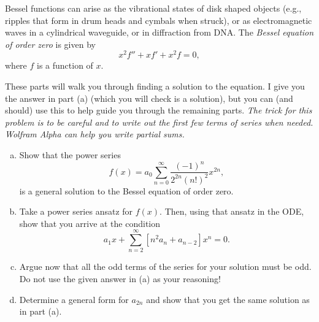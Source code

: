 \documentclass[12pt]{amsbook}
\begin{document}

\newpage
\begin{problem}
Bessel functions can arise as the vibrational states of disk shaped objects (e.g., ripples that form in drum heads and cymbals when struck), or as electromagnetic waves in a cylindrical waveguide, or in diffraction from DNA.  The \emph{Bessel equation of order zero} is given by
\[
x^2 f''+xf'+x^2f =0,
\]
where $f$ is a function of $x$.

These parts will walk you through finding a solution to the equation.  I give you the answer in part (a) (which you will check is a solution), but you can (and should) use this to help guide you through the remaining parts. \emph{The trick for this problem is to be careful and to write out the first few terms of series when needed. Wolfram Alpha can help you write partial sums.}
\begin{enumerate}[(a)]
    \item Show that the power series
    \[
        f(x) = a_0 \sum_{n=0}^\infty \frac{(-1)^n}{2^{2n} (n!)^2} x^{2n},
    \]
    is a general solution to the Bessel equation of order zero.
    \item Take a power series ansatz for $f(x)$.  Then, using that ansatz in the ODE, show that you arrive at the condition
    \[
        a_1x + \sum_{n=2}^\infty \left[ n^2 a_n + a_{n-2} \right]x^n = 0.
    \]
    \item Argue now that all the odd terms of the series for your solution must be odd. Do not use the given answer in (a) as your reasoning!
    \item Determine a general form for $a_{2n}$ and show that you get the same solution as in part (a).
\end{enumerate}
\end{problem}
\end{document}
